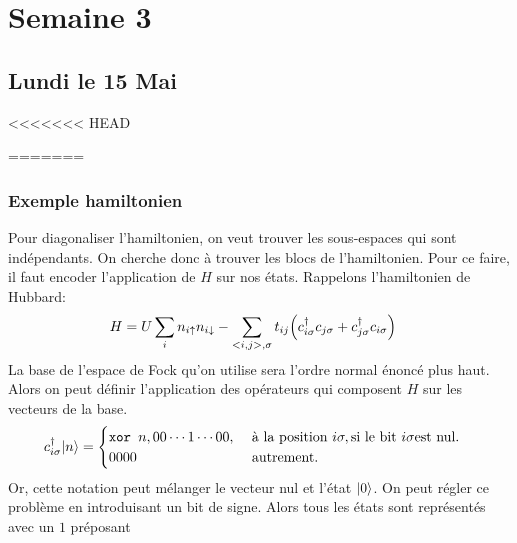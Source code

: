 \documentclass{subfiles}[../main.tex]
\begin{document}
    \section{Semaine 3} %
    \label{sec:Semaine 3}
        \subsection{Lundi le 15 Mai} %
        \label{sub:Lundi le 15 Mai}
<<<<<<< HEAD
        
    
=======

            \subsubsection{Exemple hamiltonien}
            \label{sec:Exemple hamiltonien}
                Pour diagonaliser l'hamiltonien, on veut trouver les sous-espaces
                qui sont indépendants. On cherche donc à trouver les blocs de
                l'hamiltonien. Pour ce faire, il faut encoder l'application de
                $H$ sur nos états. Rappelons l'hamiltonien de Hubbard:
                \begin{align}
                    H&=U\sum_in_{i\uparrow}n_{i\downarrow}-
                    \sum_{<i,j>,\sigma}t_{ij}\qty(c^\dagger_{i\sigma}
                    c_{j\sigma}+c^\dagger_{j\sigma}
                    c_{i\sigma})
                \end{align}
                La base de l'espace de Fock qu'on utilise sera l'ordre normal
                énoncé plus haut. Alors on peut définir l'application des
                opérateurs qui composent $H$ sur les vecteurs de la base.
                \begin{align}
                    c^\dagger_{i\sigma}\ket{n}&=
                    \begin{cases}
                        \texttt{xor } n, 00\cdots1\cdots00, &\text{ à la position }
                        i\sigma, \text{si le bit } i\sigma \text{est nul.}\\
                        0000 & \text{autrement.}
                    \end{cases}
                \end{align}
                Or, cette notation peut mélanger le vecteur nul et l'état
                $|{0}\rangle$. On peut régler ce problème en introduisant un bit de
                signe. Alors tous les états sont représentés avec un $1$ préposant
\end{document}
